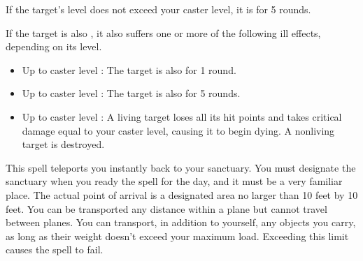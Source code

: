 \begin{spellheader}
    \begin{spelltargetinginfo}
    \end{spelltargetinginfo}
    \begin{spelleffects}
    \end{spelleffects}
\end{spellheader}
\begin{spellcontent}
    \spelleffect If the target's level does not exceed your caster level, it is \bewildered for 5 rounds.

    If the target is also \bloodied, it also suffers one or more of the following ill effects, depending on its level.
    \begin{itemize}
        \item Up to caster level : The target is also \confused for 1 round.
        \item Up to caster level : The target is also \paralyzed for 5 rounds.
        \item Up to caster level : A living target loses all its hit points and takes critical damage equal to your caster level, causing it to begin dying. A nonliving target is destroyed.
    \end{itemize}
\end{spellcontent}
\begin{spellfooter}

\end{spellfooter}

\begin{spellheader}
    \begin{spelltargetinginfo}
    \end{spelltargetinginfo}
    \begin{spelleffects}
    \end{spelleffects}
\end{spellheader}
\begin{spellcontent}
    \spelleffect This spell teleports you instantly back to your sanctuary. You must designate the sanctuary when you ready the spell for the day, and it must be a very familiar place. The actual point of arrival is a designated area no larger than 10 feet by 10 feet. You can be transported any distance within a plane but cannot travel between planes. You can transport, in addition to yourself, any objects you carry, as long as their weight doesn't exceed your maximum load. Exceeding this limit causes the spell to fail.
\end{spellcontent}
\begin{spellfooter}

\end{spellfooter}

